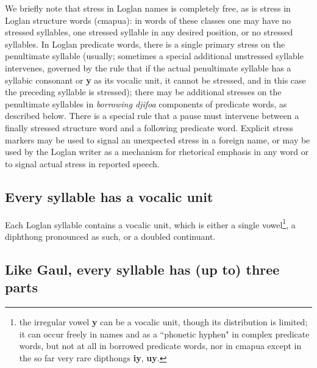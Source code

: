 \documentclass[12pt]{book}
\begin{document}
We briefly note that stress in Loglan names is completely free, as is stress in Loglan structure words (cmapua):  in words of these classes one may have no stressed syllables, one stressed syllable in any desired position, or no stressed syllables.  In Loglan predicate words, there is a single primary stress on the penultimate syllable (usually; sometimes a special additional unstressed syllable intervenes, governed by the rule that if the actual penultimate syllable has a syllabic consonant or {\bf y} as its vocalic unit, it cannot be stressed, and in this case the preceding syllable is stressed);  there may be additional stresses
on the penultimate syllables in {\em borrowing djifoa\/} components of predicate words, as described below.  There is a special rule that a pause must intervene between a finally stressed structure word and a following predicate word.  Explicit stress markers may be used to signal an unexpected stress in a foreign name, or may be used by the Loglan writer as a mechanism for rhetorical emphasis in any word or to signal actual stress in reported speech.

\subsection{Every syllable has  a vocalic unit}

Each Loglan syllable contains a vocalic unit, which is either a single vowel\footnote{the irregular vowel {\bf y} can be a vocalic unit, though its distribution is limited; it can occur freely in names and as a ``phonetic hyphen"  in complex predicate words, but  not at all  in  borrowed predicate words, nor in cmapua except in the so far very rare dipthongs {\bf iy}, {\bf uy}.}, a diphthong pronounced as such, or a doubled continuant.


\subsection{Like Gaul, every syllable has (up to) three parts}
\end{document}
